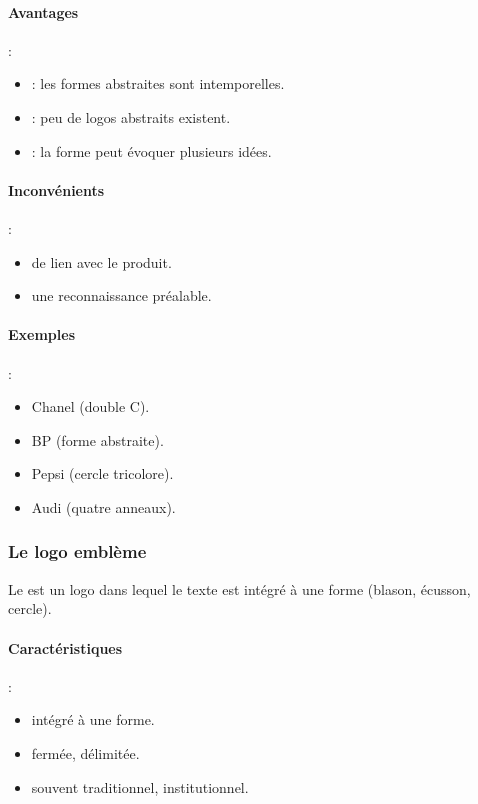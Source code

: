 \paragraph{Avantages} :
\begin{itemize}
    \item {} : les formes abstraites sont intemporelles.
    \item {} : peu de logos abstraits existent.
    \item {} : la forme peut évoquer plusieurs idées.
\end{itemize}

\paragraph{Inconvénients} :
\begin{itemize}
    \item {} de lien avec le produit.
    \item {} une reconnaissance préalable.
\end{itemize}

\paragraph{Exemples} :
\begin{itemize}
    \item Chanel (double C).
    \item BP (forme abstraite).
    \item Pepsi (cercle tricolore).
    \item Audi (quatre anneaux).
\end{itemize}

\subsubsection{Le logo emblème}

Le  est un logo dans lequel le texte est intégré à une forme (blason, écusson, cercle).

\paragraph{Caractéristiques} :
\begin{itemize}
    \item {} intégré à une forme.
    \item {} fermée, délimitée.
    \item {} souvent traditionnel, institutionnel.
\end{itemize}

